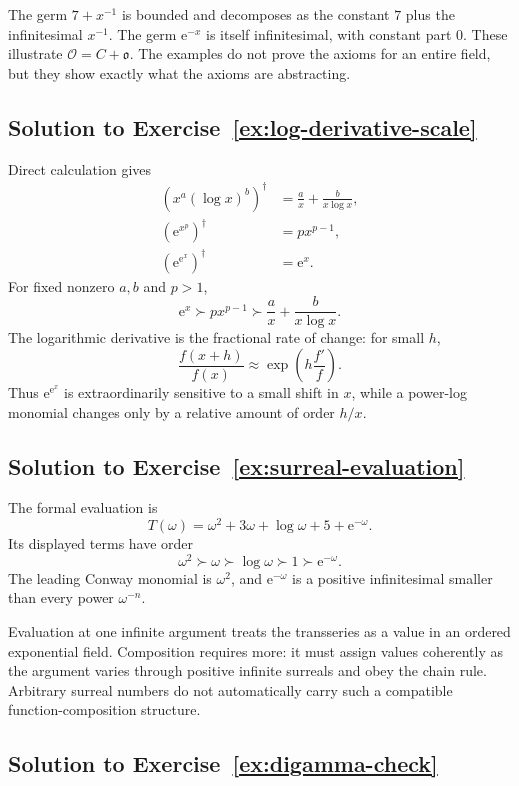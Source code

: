 \documentclass[11pt,oneside]{book}
\theoremstyle{definition}
\theoremstyle{remark}
\newcommand{\e}{\mathrm{e}}
\newcommand{\succdom}{\succ}
\begin{document}
The germ $7+x^{-1}$ is bounded and decomposes as the constant $7$ plus the
infinitesimal $x^{-1}$. The germ $\e^{-x}$ is itself infinitesimal, with constant
part $0$. These illustrate
$\mathcal O=C+\mathfrak o$. The examples do not prove the axioms for an entire
field, but they show exactly what the axioms are abstracting.

\subsection*{Solution to Exercise~\ref{ex:log-derivative-scale}}

Direct calculation gives
\begin{align*}
  \left(x^a(\log x)^b\right)^\dagger
  &=\frac{a}{x}+\frac{b}{x\log x},\\
  \left(\e^{x^p}\right)^\dagger
  &=p x^{p-1},\\
  \left(\e^{\e^x}\right)^\dagger
  &=\e^x.
\end{align*}
For fixed nonzero $a,b$ and $p>1$,
\[
  \e^x\succdom p x^{p-1}
  \succdom \frac{a}{x}+\frac{b}{x\log x}.
\]
The logarithmic derivative is the fractional rate of change: for small $h$,
\[
  \frac{f(x+h)}{f(x)}
  \approx\exp\!\left(h\frac{f'}f\right).
\]
Thus $\e^{\e^x}$ is extraordinarily sensitive to a small shift in $x$, while a
power-log monomial changes only by a relative amount of order $h/x$.

\subsection*{Solution to Exercise~\ref{ex:surreal-evaluation}}

The formal evaluation is
\[
  T(\omega)=\omega^2+3\omega+\log\omega+5+\e^{-\omega}.
\]
Its displayed terms have order
\[
  \omega^2\succdom\omega\succdom\log\omega
  \succdom1\succdom\e^{-\omega}.
\]
The leading Conway monomial is $\omega^2$, and $\e^{-\omega}$ is a positive
infinitesimal smaller than every power $\omega^{-n}$.

Evaluation at one infinite argument treats the transseries as a value in an
ordered exponential field. Composition requires more: it must assign values
coherently as the argument varies through positive infinite surreals and obey the
chain rule. Arbitrary surreal numbers do not automatically carry such a
compatible function-composition structure.

\subsection*{Solution to Exercise~\ref{ex:digamma-check}}
\end{document}
